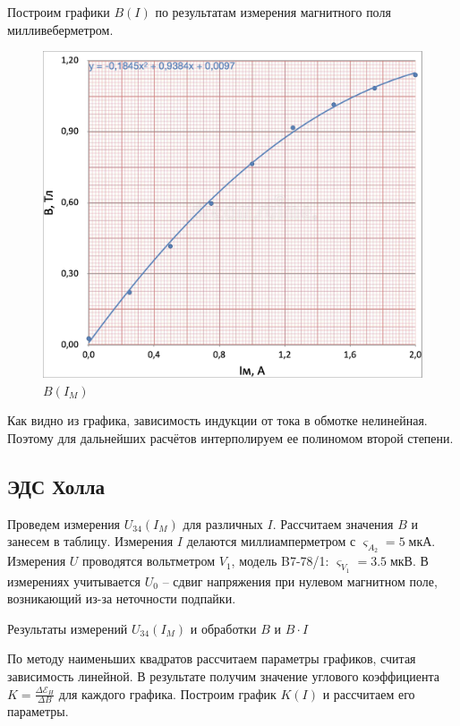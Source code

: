 \documentclass[12pt,a4paper]{article}
\begin{document}
	Построим графики $B(I)$ по результатам измерения магнитного поля милливеберметром.
	
	\begin{figure}[H]
		\includegraphics[width = 10 cm]{src/electromagnet_BI.png}
		\caption{$B(I_M)$}
	\end{figure}

	Как видно из графика, зависимость индукции от тока в обмотке нелинейная. Поэтому для дальнейших расчётов интерполируем ее полиномом второй степени.
	
	\subsection*{ЭДС Холла}

	Проведем измерения $U_{34}(I_M)$ для различных $I$. Рассчитаем значения $B$ и занесем в таблицу.
	Измерения $I$ делаются миллиамперметром с $\varsigma_{A_2} = 5 \; \text{мкА} $.
	Измерения $U$ проводятся вольтметром $V_1$, модель B7-78/1: $\varsigma_{V_1} = 3.5 \; \text{мкВ}$.
	В измерениях учитывается $U_0$ -- сдвиг напряжения при нулевом магнитном поле, возникающий из-за неточности подпайки.
	
	\begin{table}[H]
		\addtolength{\tabcolsep}{-4pt}
		\footnotesize
		
		\caption{Результаты измерений $U_{34}(I_M)$ и обработки $B$ и $B\cdot I$}
	\end{table}

	По методу наименьших квадратов рассчитаем параметры графиков, считая зависимость линейной. В результате получим значение углового коэффициента $K = \frac{\Delta \mathcal{E}_H}{\Delta B}$ для каждого графика. Построим график $K(I)$ и рассчитаем его параметры.
	
\end{document}
